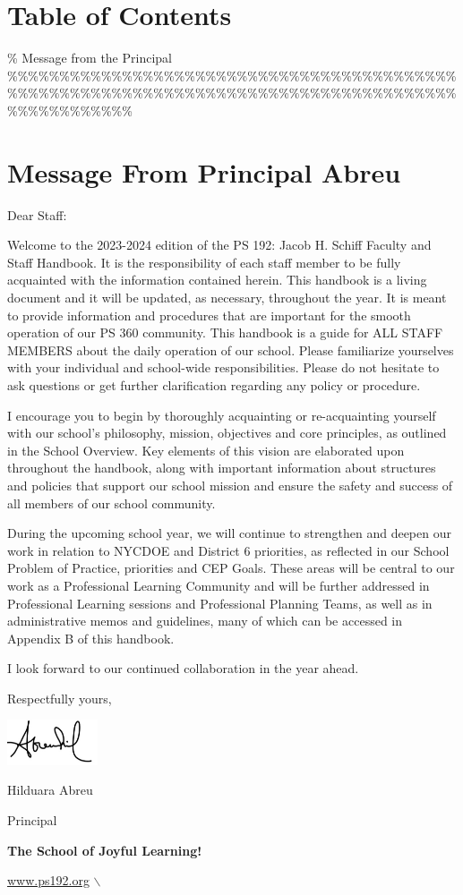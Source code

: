 \documentclass[11pt]{article}
\begin{document}
\section{Table of Contents}
\label{sec:org351620b}
\tableofcontents

\% Message from the Principal
\%\%\%\%\%\%\%\%\%\%\%\%\%\%\%\%\%\%\%\%\%\%\%\%\%\%\%\%\%\%\%\%\%\%\%\%\%\%\%\%\%\%\%\%\%\%\%\%\%\%\%\%\%\%\%\%\%\%\%\%\%\%\%\%\%\%\%\%\%\%\%\%\%\%\%\%\%\%\%\%\%\%\%\%\%\%\%\%\%\%\%\%\%\%\%\%\%\%
\newpage
\section{Message From Principal Abreu}

Dear Staff:

Welcome to the 2023-2024 edition of the PS 192: Jacob H. Schiff  Faculty and Staff Handbook. It is the responsibility of each staff member to be fully acquainted with the information contained herein. This handbook is a living document and it will be updated, as necessary, throughout the year. It is meant to provide information and procedures that are important for the smooth operation of our PS 360 community. This handbook is a guide for ALL STAFF MEMBERS about the daily operation of our school. Please familiarize yourselves with your individual and school-wide responsibilities. Please do not hesitate to ask questions or get further clarification regarding any policy or procedure.

I encourage you to begin by thoroughly acquainting or re-acquainting yourself with our school’s philosophy, mission, objectives and core principles, as outlined in the School Overview. Key elements of this vision are elaborated upon throughout the handbook, along with important information about structures and policies that support our school mission and ensure the safety and success of all members of our school community.

During the upcoming school year, we will continue to strengthen and deepen our work in relation to NYCDOE and District 6 priorities, as reflected in our School Problem of Practice, priorities and CEP Goals. These areas will be central to our work as a Professional Learning Community and will be further addressed in Professional Learning sessions and Professional Planning Teams, as well as in administrative memos and guidelines, many of which can be accessed in Appendix B of this handbook.

I look forward to our continued collaboration in the year ahead.

Respectfully yours,

\includegraphics[width=0.2\textwidth]{hil_signature}

Hilduara Abreu

Principal

\textbf{The School of Joyful Learning!}

\href{https:www.ps192.org}{www.ps192.org}
$\backslash$
\end{document}
